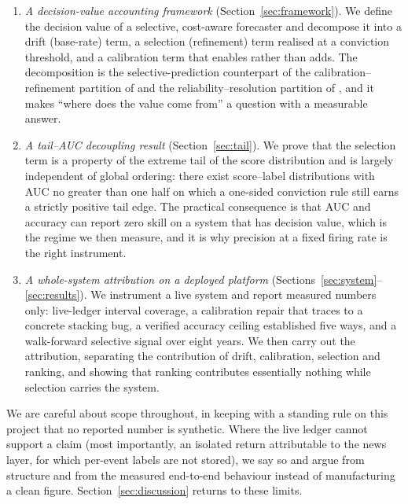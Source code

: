 \documentclass{sbc2023}%
\theoremstyle{definition}
\theoremstyle{plain}
\begin{document}
\begin{enumerate}[leftmargin=1.4em,itemsep=2pt,topsep=2pt]
\item \emph{A decision-value accounting framework} (Section~\ref{sec:framework}).
We define the decision value of a selective, cost-aware forecaster and decompose it
into a drift (base-rate) term, a selection (refinement) term realised at a
conviction threshold, and a calibration term that enables rather than adds. The
decomposition is the selective-prediction counterpart of the calibration--refinement
partition of \citep{degroot1983} and the reliability--resolution partition
of \citep{murphy1973}, and it makes ``where does the value come from'' a question with a
measurable answer.
\item \emph{A tail--AUC decoupling result} (Section~\ref{sec:tail}). We prove that
the selection term is a property of the extreme tail of the score distribution and
is largely independent of global ordering: there exist score--label distributions
with AUC no greater than one half on which a one-sided conviction rule still earns a
strictly positive tail edge. The practical consequence is that AUC and accuracy can
report zero skill on a system that has decision value, which is the regime we
then measure, and it is why precision at a fixed firing rate is the right instrument.
\item \emph{A whole-system attribution on a deployed platform}
(Sections~\ref{sec:system}--\ref{sec:results}). We instrument a live system and
report measured numbers only: live-ledger interval coverage, a calibration repair
that traces to a concrete stacking bug, a verified accuracy ceiling established five
ways, and a walk-forward selective signal over eight years. We then carry out the
attribution, separating the contribution of drift, calibration, selection and
ranking, and showing that ranking contributes essentially nothing while selection
carries the system.
\end{enumerate}

We are careful about scope throughout, in keeping with a standing
rule on this project that no reported number is synthetic. Where the live ledger
cannot support a claim (most importantly, an isolated return attributable to the
news layer, for which per-event labels are not stored), we say so and argue from
structure and from the measured end-to-end behaviour instead of manufacturing a
clean figure. Section~\ref{sec:discussion} returns to these limits.

\end{document}
